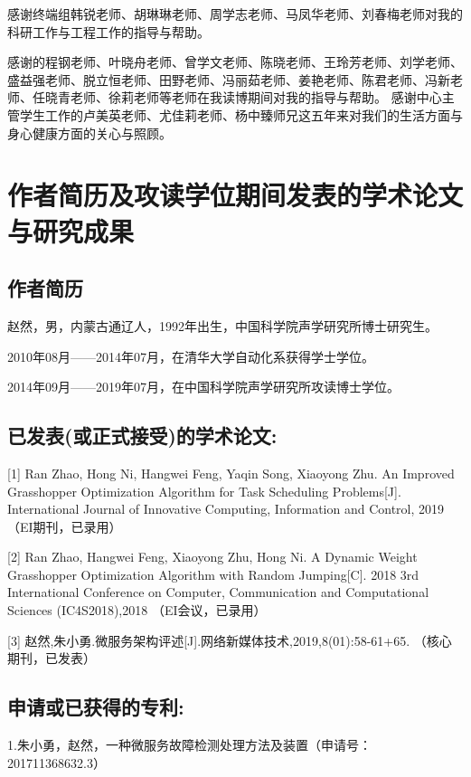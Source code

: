 感谢终端组韩锐老师、胡琳琳老师、周学志老师、马凤华老师、刘春梅老师对我的科研工作与工程工作的指导与帮助。

感谢的程钢老师、叶晓舟老师、曾学文老师、陈晓老师、王玲芳老师、刘学老师、盛益强老师、脱立恒老师、田野老师、冯丽茹老师、姜艳老师、陈君老师、冯新老师、任晓青老师、徐莉老师等老师在我读博期间对我的指导与帮助。
感谢中心主管学生工作的卢美英老师、尤佳莉老师、杨中臻师兄这五年来对我们的生活方面与身心健康方面的关心与照顾。




\chapter{作者简历及攻读学位期间发表的学术论文与研究成果}


\section*{作者简历}

赵然，男，内蒙古通辽人，1992年出生，中国科学院声学研究所博士研究生。

2010年08月——2014年07月，在清华大学自动化系获得学士学位。

2014年09月——2019年07月，在中国科学院声学研究所攻读博士学位。


\section*{已发表(或正式接受)的学术论文:}

[1] Ran Zhao, Hong Ni, Hangwei Feng, Yaqin Song, Xiaoyong Zhu. An Improved Grasshopper Optimization Algorithm for Task Scheduling Problems[J]. International Journal of Innovative Computing, Information and Control, 2019（EI期刊，已录用）

[2] Ran Zhao, Hangwei Feng, Xiaoyong Zhu, Hong Ni. A Dynamic Weight Grasshopper Optimization Algorithm with Random Jumping[C]. 2018 3rd International Conference on Computer, Communication and Computational Sciences (IC4S2018),2018 （EI会议，已录用）

[3] 赵然,朱小勇.微服务架构评述[J].网络新媒体技术,2019,8(01):58-61+65. （核心期刊，已发表）

\section*{申请或已获得的专利:}

1.朱小勇，赵然，一种微服务故障检测处理方法及装置（申请号： 201711368632.3）

